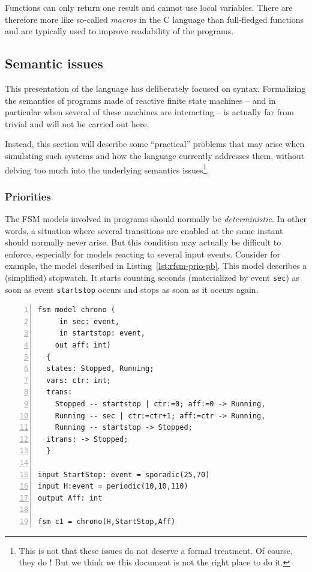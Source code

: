 \medskip
\step Functions can only return one result and cannot use local variables. There are therefore more
like so-called \emph{macros} in the C language than full-fledged functions and are typically used to
improve readability of the programs.

\subsection{Semantic issues}
\label{sec:semantic-issues}

This presentation of the language has deliberately focused on syntax. Formalizing the semantics of programs made of
reactive finite state machines -- and in particular when several of these machines are interacting
-- is actually far from trivial and will not be carried out here. 

Instead, this section will describe some ``practical'' problems that may arise when simulating such
systems and how the language currently addresses them, without delving too much into the underlying
semantics issues\footnote{This is not that these issues do not deserve a formal treatment. Of
  course, they do ! But we think we this document is not the right place to do it.}.

\subsubsection{Priorities}
\label{sec:priorities}

The FSM models involved in programs should normally be \emph{deterministic}. In other words, a
situation where several transitions are enabled at the same instant should normally never arise. But
this condition may actually be difficult to enforce, especially for models reacting to several input
events. Consider for example, the model described in Listing~\ref{lst:rfsm-prio-pb}. This model
describes a (simplified) stopwatch. It starts counting seconds (materialized by event \verb|sec|)
as soon as event \verb|startstop| occurs and stops as soon as it occurs again.

\begin{lstlisting}[language=Rfsm,frame=single,numbers=left,caption=A program showing a potentially non-deterministic
  model,label={lst:rfsm-prio-pb},float]
fsm model chrono (
     in sec: event,
     in startstop: event,
    out aff: int)
  {
  states: Stopped, Running;
  vars: ctr: int;
  trans:
    Stopped -- startstop | ctr:=0; aff:=0 -> Running,
    Running -- sec | ctr:=ctr+1; aff:=ctr -> Running,
    Running -- startstop -> Stopped;
  itrans: -> Stopped;
  }

input StartStop: event = sporadic(25,70)
input H:event = periodic(10,10,110)
output Aff: int

fsm c1 = chrono(H,StartStop,Aff)
\end{lstlisting}

